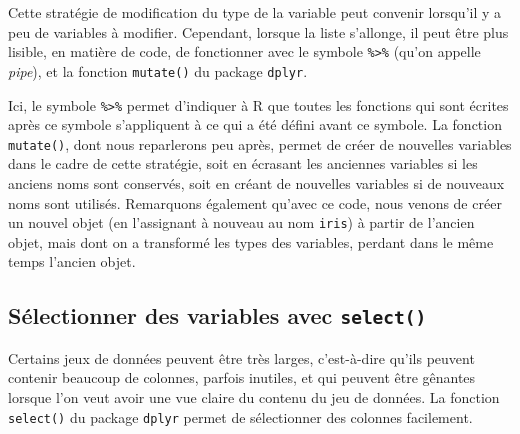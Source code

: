 \documentclass[
  french,
]{book}
\newenvironment{Shaded}{\begin{snugshade}}{\end{snugshade}}
\newcommand{\DataTypeTok}[1]{\textcolor[rgb]{0.13,0.29,0.53}{#1}}
\newcommand{\KeywordTok}[1]{\textcolor[rgb]{0.13,0.29,0.53}{\textbf{#1}}}
\newcommand{\NormalTok}[1]{#1}
\newcommand{\OperatorTok}[1]{\textcolor[rgb]{0.81,0.36,0.00}{\textbf{#1}}}
\newcommand{\StringTok}[1]{\textcolor[rgb]{0.31,0.60,0.02}{#1}}
\begin{document}
Cette stratégie de modification du type de la variable peut convenir lorsqu'il y a peu de variables à modifier. Cependant, lorsque la liste s'allonge, il peut être plus lisible, en matière de code, de fonctionner avec le symbole \texttt{\%\textgreater{}\%} (qu'on appelle \emph{pipe}), et la fonction \texttt{mutate()} du package \texttt{dplyr}.

\begin{Shaded}
\end{Shaded}

Ici, le symbole \texttt{\%\textgreater{}\%} permet d'indiquer à R que toutes les fonctions qui sont écrites après ce symbole s'appliquent à ce qui a été défini avant ce symbole. La fonction \texttt{mutate()}, dont nous reparlerons peu après, permet de créer de nouvelles variables dans le cadre de cette stratégie, soit en écrasant les anciennes variables si les anciens noms sont conservés, soit en créant de nouvelles variables si de nouveaux noms sont utilisés. Remarquons également qu'avec ce code, nous venons de créer un nouvel objet (en l'assignant à nouveau au nom \texttt{iris}) à partir de l'ancien objet, mais dont on a transformé les types des variables, perdant dans le même temps l'ancien objet.

\hypertarget{suxe9lectionner-des-variables-avec-select}{%
\subsection{\texorpdfstring{Sélectionner des variables avec \texttt{select()}}{Sélectionner des variables avec select()}}\label{suxe9lectionner-des-variables-avec-select}}

Certains jeux de données peuvent être très larges, c'est-à-dire qu'ils peuvent contenir beaucoup de colonnes, parfois inutiles, et qui peuvent être gênantes lorsque l'on veut avoir une vue claire du contenu du jeu de données. La fonction \texttt{select()} du package \texttt{dplyr} permet de sélectionner des colonnes facilement.
\end{document}
